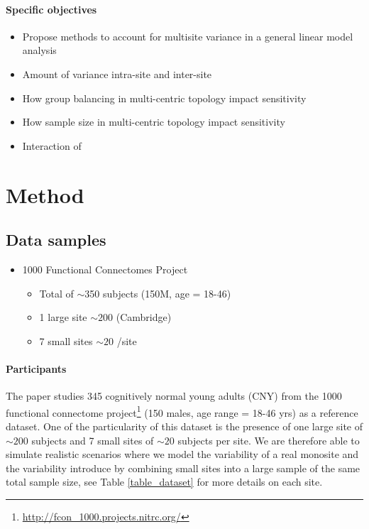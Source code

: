 \documentclass[authoryear]{elsarticle}
\begin{document}
\paragraph{Specific objectives} 

\begin{itemize}
 \item Propose methods to account for multisite variance in a general linear model analysis
 \item Amount of variance intra-site and inter-site
 \item How group balancing in multi-centric topology impact sensitivity
 \item How sample size in multi-centric topology impact sensitivity
 \item Interaction of 
\end{itemize}


\section{Method}

\subsection{Data samples} 


\begin{itemize}
\item 1000 Functional Connectomes Project
\begin{itemize}
\item Total of $\sim$350 subjects (150M, age = 18-46)
\item 1 large site $\sim 200$ (Cambridge)
\item 7 small sites $\sim 20$ /site
\end{itemize}
\end{itemize}



\paragraph{Participants}
The paper studies 345 cognitively normal young adults (CNY) from the 1000 functional connectome project\footnote{\url{http://fcon_1000.projects.nitrc.org/}} (150 males, age range = 18-46 yrs) as a reference dataset. One of the particularity of this dataset is the presence of one large site of $\sim 200$ subjects and 7 small sites of $\sim 20$ subjects per site. We are therefore able to simulate realistic scenarios where we model the variability of a real monosite and the variability introduce by combining small sites into a large sample of the same total sample size, see Table \ref{table_dataset} for more details on each site.
\end{document}
